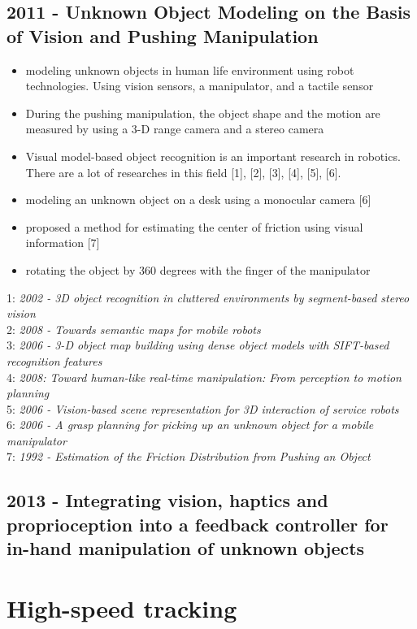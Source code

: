 \subsection{2011 - Unknown Object Modeling on the Basis of Vision and Pushing Manipulation}
\begin{itemize}
\item modeling unknown objects in human life environment using robot technologies. Using vision sensors, a manipulator, and a tactile sensor
\item During the pushing manipulation, the object shape and the motion are measured by using a 3-D range camera and a stereo camera
\item Visual model-based object recognition is an important research in robotics. There are a lot of researches in this field [1], [2], [3], [4], [5], [6].
\item modeling an unknown object on a desk using
a monocular camera [6]
\item proposed a method for estimating the center of friction using visual information [7]
\item  rotating the
object by 360 degrees with the finger of the manipulator
\end{itemize}
1: \textit{2002 -  3D object recognition in cluttered
environments by segment-based stereo vision} \\
2: \textit{2008 - Towards semantic maps for mobile robots} \\
3: \textit{2006 - 3-D object map building using dense object models with SIFT-based recognition features} \\
4: \textit{2008: Toward human-like real-time manipulation: From perception to motion planning} \\
5: \textit{2006 - Vision-based scene representation for 3D interaction of service robots} \\
6: \textit{2006 - A grasp planning for picking
up an unknown object for a mobile manipulator} \\
7: \textit{1992 - Estimation of the Friction Distribution
from Pushing an Object}

\subsection{2013 - Integrating vision, haptics and proprioception into a feedback controller for in-hand manipulation of unknown objects}

\section{High-speed tracking}
